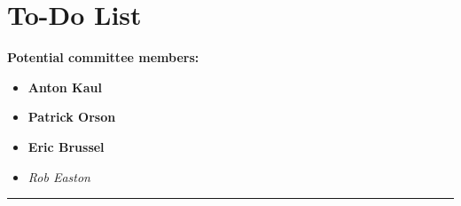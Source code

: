 \chapter{To-Do List}\label{ch:todo}

\textbf{Potential committee members:}
\begin{itemize}
    \item \textbf{\textcolor{OliveGreen}{Anton Kaul}}
    \item \textbf{Patrick Orson}
    \item \textbf{Eric Brussel}
    \item \textit{Rob Easton}
    
\end{itemize}

\begin{center}\rule{.85\textwidth}{0.65pt}\end{center}

